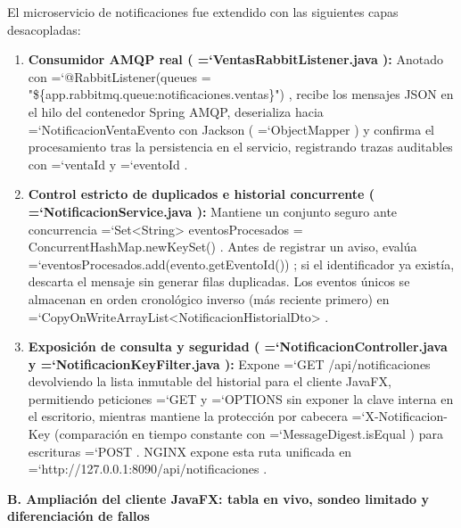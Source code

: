\documentclass[11pt,a4paper]{article}
\renewcommand{\_}{\oldunderscore\allowbreak}
\DeclareRobustCommand{\texttt}[1]{%
  {\upshape\ttfamily\fontsize{9}{10.8}\selectfont\hyphenchar\font=`\-\relax #1}%
}
\begin{document}
\noindent El microservicio de notificaciones fue extendido con las siguientes capas desacopladas:
\begin{enumerate}[leftmargin=*,itemsep=2pt,topsep=1pt]
  \item \textbf{Consumidor AMQP real (\texttt{VentasRabbitListener.\allowbreak{}java}):} Anotado con \texttt{@RabbitListener(queues = "\$\{app.\allowbreak{}rabbitmq.\allowbreak{}queue:\allowbreak{}notificaciones.\allowbreak{}ventas\}")}, recibe los mensajes JSON en el hilo del contenedor Spring AMQP, deserializa hacia \texttt{NotificacionVentaEvento} con Jackson (\texttt{ObjectMapper}) y confirma el procesamiento tras la persistencia en el servicio, registrando trazas auditables con \texttt{ventaId} y \texttt{eventoId}.
  \item \textbf{Control estricto de duplicados e historial concurrente (\texttt{NotificacionService.\allowbreak{}java}):} Mantiene un conjunto seguro ante concurrencia \texttt{Set<String> eventosProcesados = ConcurrentHashMap.\allowbreak{}newKeySet()}. Antes de registrar un aviso, evalúa \texttt{eventosProcesados.\allowbreak{}add(evento.\allowbreak{}getEventoId())}; si el identificador ya existía, descarta el mensaje sin generar filas duplicadas. Los eventos únicos se almacenan en orden cronológico inverso (más reciente primero) en \texttt{CopyOnWriteArrayList<NotificacionHistorialDto>}.
  \item \textbf{Exposición de consulta y seguridad (\texttt{NotificacionController.\allowbreak{}java} y \texttt{NotificacionKeyFilter.\allowbreak{}java}):} Expone \texttt{GET /\allowbreak{}api/\allowbreak{}notificaciones} devolviendo la lista inmutable del historial para el cliente JavaFX, permitiendo peticiones \texttt{GET} y \texttt{OPTIONS} sin exponer la clave interna en el escritorio, mientras mantiene la protección por cabecera \texttt{X-Notificacion-Key} (comparación en tiempo constante con \texttt{MessageDigest.\allowbreak{}isEqual}) para escrituras \texttt{POST}. NGINX expone esta ruta unificada en \texttt{http:\allowbreak{}/\allowbreak{}/\allowbreak{}127.\allowbreak{}0.\allowbreak{}0.\allowbreak{}1:\allowbreak{}8090/\allowbreak{}api/\allowbreak{}notificaciones}.
\end{enumerate}

\vspace{0.2cm}
\noindent\textbf{B. Ampliación del cliente JavaFX: tabla en vivo, sondeo limitado y diferenciación de fallos}
\end{document}
